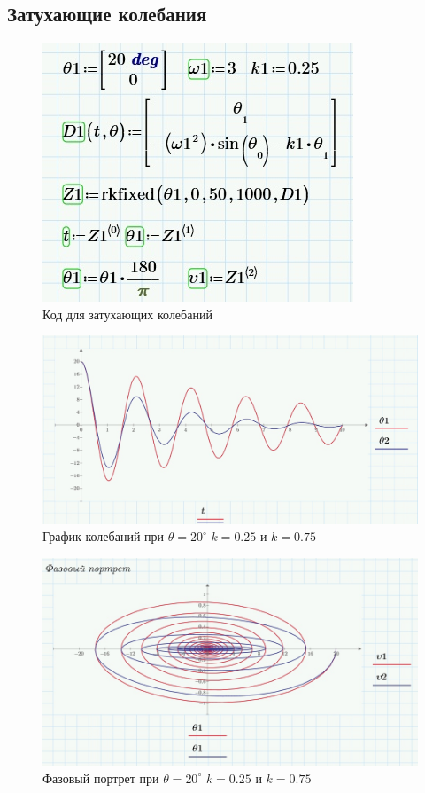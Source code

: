 \documentclass[a4paper, 14pt]{extarticle}
\begin{document}
	\subsection{Затухающие колебания}
		\begin{figure}[H]
			\centering
			\includegraphics[width = .7\linewidth]{20.jpg}
			\caption[.] {Код для затухающих колебаний}
		\end{figure}	
		\begin{figure}[H]
			\centering
			\includegraphics[width = \linewidth]{11.jpg}
			\caption[.] {График колебаний при $\theta = 20^{\circ}$ $k = 0.25$ и $k=0.75$}
		\end{figure}
		\begin{figure}[H]
			\centering
			\includegraphics[width = \linewidth]{12.jpg}
			\caption[.] {Фазовый портрет при $\theta = 20^{\circ}$ $k = 0.25$ и $k=0.75$}
		\end{figure}
\end{document}
